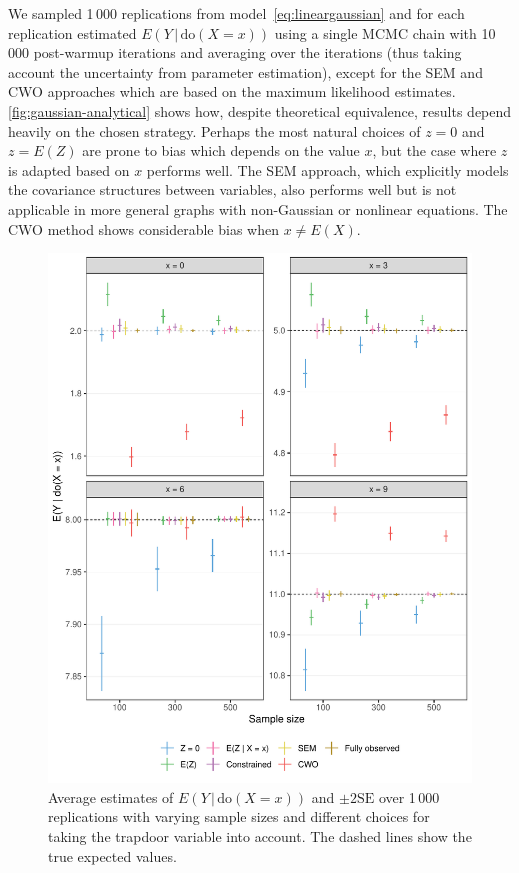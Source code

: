 \documentclass{statsoc}
\newcommand{\+}[1]{\ensuremath{\mathbf{#1}}}
\newcommand{\doo}{\textrm{do}}
\newcommand{\given}{{ \, | \, }}
\begin{document}
We sampled 1\,000 replications from model~\eqref{eq:lineargaussian} and for each replication estimated $E(Y \given  \doo(X = x))$ using a single MCMC chain with 10\,000 post-warmup iterations and averaging over the iterations (thus taking account the uncertainty from parameter estimation), except for the SEM and CWO approaches which are based on the maximum likelihood estimates. \autoref{fig:gaussian-analytical} shows how, despite theoretical equivalence, results depend heavily on the chosen strategy. Perhaps the most natural choices of $z=0$ and $z=E(Z)$ are prone to bias which depends on the value $x$, but the case where $z$ is adapted based on $x$ performs well. The SEM approach, which explicitly models the covariance structures between variables, also performs well but is not applicable in more general graphs with non-Gaussian or nonlinear equations. The CWO method shows considerable bias when $x \neq E(X)$.
\begin{figure}[!ht]
\includegraphics[width=\textwidth]{figures/gaussian.pdf}
\caption{Average estimates of $E(Y \given  \doo(X = x))$ and $\pm 2 \textrm{SE}$  over 1\,000 replications with varying sample sizes and different choices for taking the trapdoor variable into account. The dashed lines show the true expected values.}
\label{fig:gaussian-analytical}
\end{figure}
\end{document}
